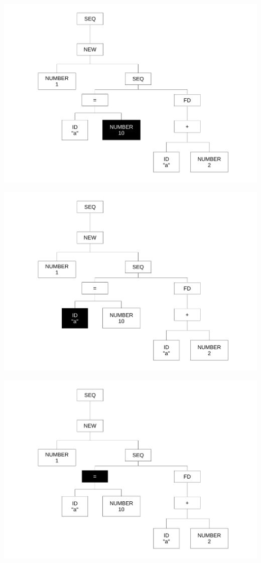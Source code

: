 \begin{frame}
\includegraphics[scale=0.3]{doc/Presentation/img/arbre7.pdf}
\end{frame}

\begin{frame}
\includegraphics[scale=0.3]{doc/Presentation/img/arbre6.pdf}
\end{frame}

\begin{frame}
\includegraphics[scale=0.3]{doc/Presentation/img/arbre5.pdf}
\end{frame}

